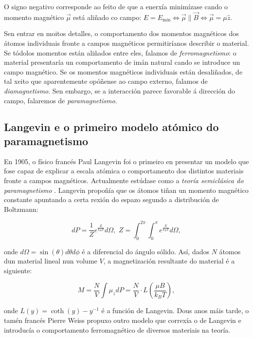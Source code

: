\begin{refsection}
\begin{multicols}{2}
O signo negativo corresponde ao feito de que a enerxía minimízase cando o
momento magnético $\vec \mu$ está aliñado co campo: $E=E_\mathrm{mín}
\Leftrightarrow \vec \mu \parallel \vec B \Leftrightarrow \vec \mu=\mu \hat z$. 

Sen entrar en moitos detalles, o comportamento dos momentos magnéticos dos
átomos individuais fronte a campos magnéticos permitiríanos describir o
material. Se tódolos momentos están aliñados entre eles, falamos de
\emph{ferromagnetismo}: o material presentaría un comportamento de imán natural
cando se introduce un campo magnético. Se os momentos magnéticos individuais
están desaliñados, de tal xeito que aparentemente opóñense ao campo externo,
falamos de \emph{diamagnetismo}. Sen embargo, se a interacción parece favorable
á dirección do campo, falaremos de \emph{paramagnetismo}.

\subsection*{Langevin e o primeiro modelo atómico do paramagnetismo}

En 1905, o físico francés Paul Langevin foi o primeiro en presentar un modelo
que fose capaz de explicar a escala atómica o comportamento dos distintos
materiais fronte a campos magnéticos. Actualmente estúdase como a \emph{teoría
semiclásica do paramagnetismo} \cite[Sec. 2.1.4.]{blundell.s_2001}. Langevin
propoñía que os átomos tiñan un momento magnético constante apuntando a certa
rexión do espazo segundo a distribución de Boltzmann:

\begin{equation}\label{ec.: bvl_boltzmann}
    dP = \frac{1}{Z}e^{\frac{E}{k_B T}}d\Omega,\,\, Z
    =\int_{0}^{2\pi}\int_{0}^{\pi}e^{\frac{E}{k_B T}}d\Omega,
\end{equation}

onde $d\Omega = \sin(\theta)d\theta d\phi$ é a diferencial do ángulo sólido.
Así, dados $N$ átomos dun material lineal nun volume $V$, a magnetización
resultante do material é a siguiente:

\begin{equation}\label{ec.: blv_langevin}
    M = \frac{N}{V} \int\mu_zdP = \frac{N}{V}\cdot
    L\left(\frac{\mu B}{k_B T}\right),
\end{equation}

onde $L(y) = \coth(y)-y^{-1}$ é a función de Langevin. Dous anos máis tarde, o
tamén francés Pierre Weiss propuxo outro modelo que correxía o de Langevin e
introducía o comportamento ferromagnético de diversos materiais na teoría.


\end{multicols}
\end{refsection}
